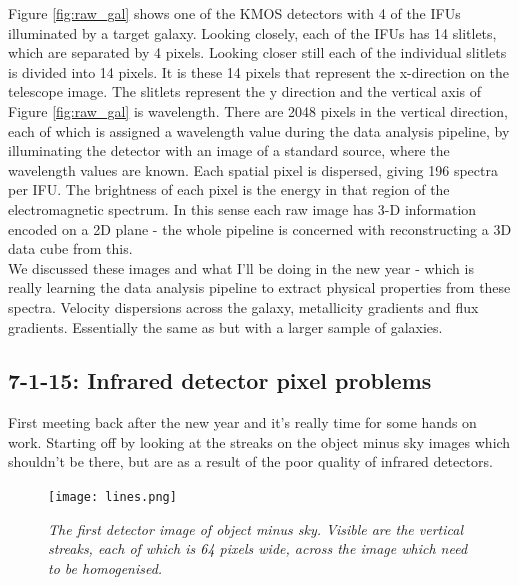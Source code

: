 \documentclass{literature}
\begin{document}
Figure \ref{fig:raw_gal} shows one of the KMOS detectors with 4 of the IFUs illuminated by a target galaxy. Looking closely, each of the IFUs has 14 slitlets, which are separated by 4 pixels. Looking closer still each of the individual slitlets is divided into 14 pixels. It is these 14 pixels that represent the x-direction on the telescope image. The slitlets represent the y direction and the vertical axis of Figure \ref{fig:raw_gal} is wavelength. There are 2048 pixels in the vertical direction, each of which is assigned a wavelength value during the data analysis pipeline, by illuminating the detector with an image of a standard source, where the wavelength values are known. Each spatial pixel is dispersed, giving 196 spectra per IFU. The brightness of each pixel is the energy in that region of the electromagnetic spectrum. In this sense each raw image has 3-D information encoded on a 2D plane - the whole pipeline is concerned with reconstructing a 3D data cube from this. \\ 
We discussed these images and what I'll be doing in the new year - which is really learning the data analysis pipeline to extract physical properties from these spectra. Velocity dispersions across the galaxy, metallicity gradients and flux gradients. Essentially the same as \citep{Troncoso_2014} but with a larger sample of galaxies. 

\subsection{7-1-15: Infrared detector pixel problems}

First meeting back after the new year and it's really time for some hands on work. Starting off by looking at the streaks on the object minus sky images which shouldn't be there, but are as a result of the poor quality of infrared detectors. 

\begin{figure}[!htp]
\centering
\texttt{[image: lines.png]}
\caption{\footnotesize{\emph{The first detector image of object minus sky. Visible are the vertical streaks, each of which is 64 pixels wide, across the image which need to be homogenised.}}}
\label{fig:obs-sky}
\end{figure}
\end{document}
